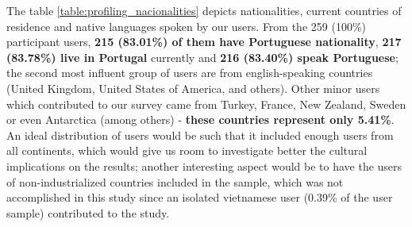 %
The table \ref{table:profiling_nacionalities} depicts nationalities, current countries of residence and native languages spoken by our users. From the 259 (100\%) participant users,
\textbf{215 (83.01\%) of them have Portuguese nationality}, \textbf{217 (83.78\%) live in Portugal} currently and \textbf{216 (83.40\%) speak Portuguese}; the second most influent group of users are from english-speaking
countries (United Kingdom, United States of America, and others). Other minor users which contributed to our survey came from Turkey, France, New Zealand, Sweden or even Antarctica (among others) -
\textbf{these countries represent only 5.41\%}. An ideal distribution of users would be such that it included enough users from all continents, which would give us room to investigate better the cultural
implications on the results; another interesting aspect would be to have the users of non-industrialized countries included in the sample, which was not accomplished in this study since an isolated vietnamese
user (0.39\% of the user sample) contributed to the study.
%
